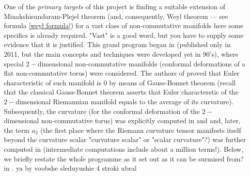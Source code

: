 \documentclass{article}
\begin{document}
One of the {\it primary targets} of this project is {\color{red} finding a suitable extension of} Minakshisundaram-Plejel theorem (and, consequently, Weyl theorem --- see formula \eqref{weyl formula}) {\color{red}for} a vast class of non-commutative manifolds {\color{red} here some specifics is already required. "Vast" is a good word, but you have to supply some evidence that it is justified}. This grand program began in \cite{ConnesTretkoff} (published only in 2011, but {\color{red} the main concepts and techniques were developed yet in 90's}), where special $2-$dimensional non-commutative manifolds (conformal deformations of a flat non-commutative torus) were considered. The authors of \cite{ConnesTretkoff} proved that Euler characteristic of such manifold is $0$ by means of Gauss-Bonnet theorem (recall that the classical Gauss-Bonnet theorem asserts that Euler characterstic of the $2-$dimensional Riemannian manifold equals to the average of its curvature). Subsequently, the curvature (for the conformal deformation of the $2-$dimensional non-commutative torus) was explicitly computed in \cite{ConnesMoscovici_curvature} and \cite{FathizadehKhalkhali} and, later, the term $a_2$ (the first place where the Riemann curvature tensor manifests itself beyond the curvature
scalar {\color{red} "curvature
scalar" or "scalar curvature"?}) was further computed in \cite{ConnesFathizadeh} (intermediate computations include about a million terms!). Below, we briefly restate the whole programme as it set out{\color{red} as it can be surmised from?}  in \cite{ConnesTretkoff}. {\color{red} ya by voobshe sleduyushie 4 stroki ubral} 
\end{document}
